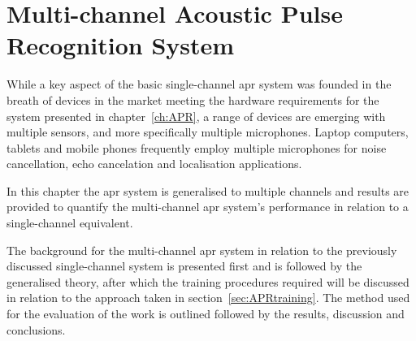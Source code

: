 \chapter{Multi-channel Acoustic Pulse Recognition System}\label{ch:MultichannelAPR}

\ifpdf
    \graphicspath{{Chapter4_MultiAPR/Chapter4Figs/PNG/}{Chapter4_MultiAPR/Chapter4Figs/PDF/}{Chapter4_MultiAPR/Chapter4Figs/}{Chapter4_MultiAPR/Chapter4Figs/Training/}}
\else
    \graphicspath{{Chapter4_MultiAPR/Chapter4Figs/EPS/}{Chapter4_MultiAPR/Chapter4Figs/}}
\fi

While a key aspect of the basic single-channel \gls{apr} system was founded in the breath of devices in the market meeting the hardware requirements for the system presented in chapter~\ref{ch:APR}, a range of devices are emerging with multiple sensors, and more specifically multiple microphones. Laptop computers, tablets and mobile phones frequently employ multiple microphones for noise cancellation\cite{Habets2013}\cite{Habets2012}, echo cancelation\cite{US7925007} and localisation applications\cite{US8174547}\linebreak[2]\cite{US8233353}.

In this chapter the \gls{apr} system is generalised to multiple channels and results are provided to quantify the multi-channel \gls{apr} system's performance in relation to a single-channel equivalent.

The background for the multi-channel \gls{apr} system in relation to the previously discussed single-channel system is presented first and is followed by the generalised theory, after which the training procedures required will be discussed in relation to the approach taken in section~\ref{sec:APRtraining}. The method used for the evaluation of the work is outlined followed by the results, discussion and conclusions.

